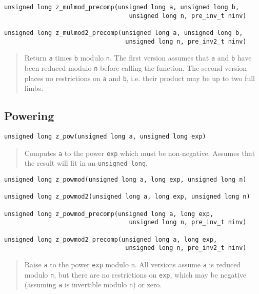 \documentclass[a4paper,10pt]{article}
\newcommand{\code}{\lstinline}
\begin{document}
\begin{lstlisting}
unsigned long z_mulmod_precomp(unsigned long a, unsigned long b, 
                                  unsigned long n, pre_inv_t ninv)
                                         
unsigned long z_mulmod2_precomp(unsigned long a, unsigned long b, 
                                 unsigned long n, pre_inv2_t ninv)
\end{lstlisting}
\begin{quote}
Return \code{a} times \code{b} modulo \code{n}. The first version assumes that \code{a} and \code{b} have been reduced modulo \code{n} before calling the function. The second version places no restrictions on \code{a} and \code{b}, i.e. their product may be up to two full limbs.
\end{quote}
      
\subsection{Powering}
       
\begin{lstlisting}
unsigned long z_pow(unsigned long a, unsigned long exp)
\end{lstlisting}
\begin{quote}
Computes \code{a} to the power \code{exp} which must be non-negative. Assumes that the result will fit in an \code{unsigned long}.
\end{quote}
                            
\begin{lstlisting}
unsigned long z_powmod(unsigned long a, long exp, unsigned long n)

unsigned long z_powmod2(unsigned long a, long exp, unsigned long n)

unsigned long z_powmod_precomp(unsigned long a, long exp, 
                                  unsigned long n, pre_inv_t ninv)
                                     
unsigned long z_powmod2_precomp(unsigned long a, long exp, 
                                 unsigned long n, pre_inv2_t ninv)
\end{lstlisting}
\begin{quote}
Raise \code{a} to the power \code{exp} modulo \code{n}. All versions assume \code{a} is reduced modulo \code{n}, but there are no restrictions on \code{exp}, which may be negative (assuming \code{a} is invertible modulo \code{n}) or zero. 
\end{quote}                              
\end{document}
